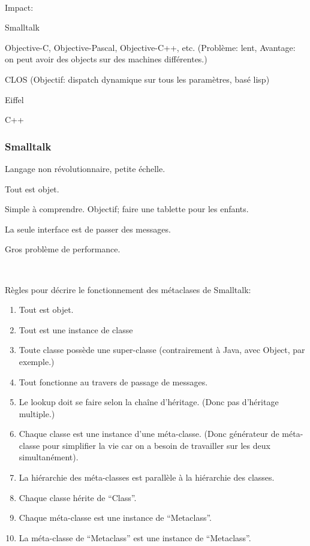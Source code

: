 \documentclass[a4paper,11pt]{article}
\begin{document}
\

Impact:

Smalltalk

Objective-C, Objective-Pascal, Objective-C++, etc. (Problème: lent, Avantage: on
peut avoir des objects sur des machines différentes.)

CLOS (Objectif: dispatch dynamique sur tous les paramètres, basé lisp)

Eiffel

C++

\subsubsection{Smalltalk}

Langage non révolutionnaire, petite échelle.

Tout est objet.

Simple à comprendre. Objectif; faire une tablette pour les enfants.

La seule interface est de passer des messages.

Gros problème de performance.

\

Règles pour décrire le fonctionnement des métaclases de Smalltalk:

\begin{enumerate}

\item Tout est objet.

\item Tout est une instance de classe

\item Toute classe possède une super-classe (contrairement à Java, avec Object,
  par exemple.)

\item Tout fonctionne au travers de passage de messages.

\item Le lookup doit se faire selon la chaîne d'héritage. (Donc pas d'héritage
  multiple.)

\item Chaque classe est une instance d'une méta-classe. (Donc générateur de
  méta-classe pour simplifier la vie car on a besoin de travailler sur les deux
  simultanément).

\item La hiérarchie des méta-classes est parallèle à la hiérarchie des classes.

\item Chaque classe hérite de ``Class''.

\item Chaque méta-classe est une instance de ``Metaclass''.

  \item La méta-classe de ``Metaclass'' est une instance de ``Metaclass''.

\end{enumerate}
\end{document}
